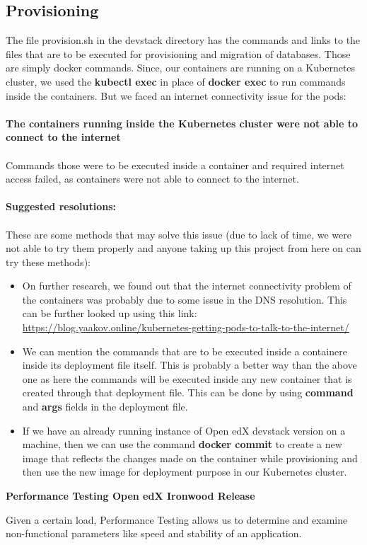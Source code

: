 \documentclass[12pt]{article}
\begin{document}
\subsection{Provisioning}
The file provision.sh in the devstack directory has the commands and links to the files that are to be executed for provisioning and migration of databases. Those are simply docker commands. Since, our containers are running on a Kubernetes cluster, we used the \textbf{kubectl exec} in place of \textbf{docker exec} to run commands inside the containers. But we faced an internet connectivity issue for the pods: \\\\
\textbf{The containers running inside the Kubernetes cluster were not able to connect to the internet}\\\\
Commands those were to be executed inside a container and required internet access failed, as containers were not able to connect to the internet.\\\\
\textbf{Suggested resolutions:\\\\}These are some methods that may solve this issue (due to lack of time, we were not able to try them properly and anyone taking up this project from here on can try these methods):
\begin{itemize}
	\item On further research, we found out that the internet connectivity problem of the containers was probably due to some issue in the DNS resolution. This can be further looked up using this link: \href{https://blog.yaakov.online/kubernetes-getting-pods-to-talk-to-the-internet/}{https://blog.yaakov.online/kubernetes-getting-pods-to-talk-to-the-internet/}\cite{DNS}
	\item We can mention the commands that are to be executed inside a containere inside its deployment file itself. This is probably a better way than the above one as here the commands will be executed inside any new container that is created through that deployment file. This can be done by using \textbf{command} and \textbf{args} fields in the deployment file.
	\item If we have an already running instance of Open edX devstack version on a machine, then we can use the command \textbf{docker commit} to create a new image that reflects the changes made on the container while provisioning and then use the new image for deployment purpose in our Kubernetes cluster.
\end{itemize}
\pagebreak
\begin{center}
	\textbf{\Large{Performance Testing Open edX Ironwood Release}}
\end{center}
Given a certain load, Performance Testing allows us to determine and examine non-functional parameters like speed and stability of an application.
\par
\end{document}
